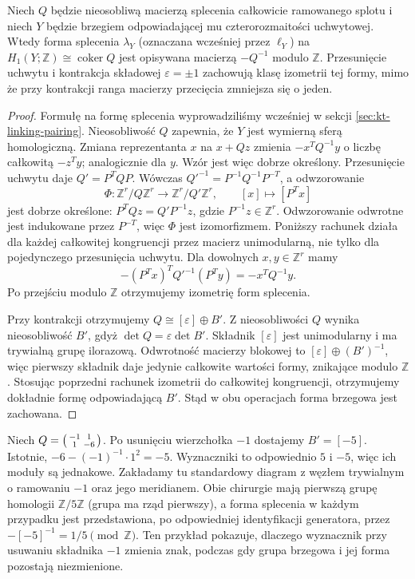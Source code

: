 \begin{stwierdzenie}
Niech $Q$ będzie nieosobliwą macierzą splecenia
całkowicie ramowanego splotu i niech $Y$ będzie
brzegiem odpowiadającej mu czterorozmaitości uchwytowej.
Wtedy forma splecenia $\lambda_Y$ (oznaczana wcześniej przez $\ell_Y$) na
$H_1(Y;\mathbb Z)\cong\operatorname{coker}Q$ jest
opisywana macierzą $-Q^{-1}$ modulo $\mathbb Z$.
Przesunięcie uchwytu i kontrakcja składowej
$\varepsilon=\pm1$ zachowują klasę izometrii
tej formy, mimo że przy kontrakcji ranga macierzy
przecięcia zmniejsza się o jeden.
\end{stwierdzenie}
\begin{proof}
Formułę na formę splecenia wyprowadziliśmy wcześniej
w sekcji \ref{sec:kt-linking-pairing}.
Nieosobliwość $Q$ zapewnia, że $Y$ jest wymierną
sferą homologiczną. Zmiana reprezentanta $x$
na $x+Qz$ zmienia $-x^TQ^{-1}y$
o liczbę całkowitą $-z^Ty$; analogicznie
dla $y$. Wzór jest więc dobrze określony. Przesunięcie
uchwytu daje $Q'=P^TQP$. Wówczas
${Q'}^{-1}=P^{-1}Q^{-1}P^{-T}$, a odwzorowanie
\[
 \Phi\colon \mathbb Z^r/Q\mathbb Z^r
 \longrightarrow \mathbb Z^r/Q'\mathbb Z^r,\qquad
 [x]\longmapsto[P^Tx]
\]
jest dobrze określone: $P^TQz=Q'P^{-1}z$,
gdzie $P^{-1}z\in\mathbb Z^r$.
Odwzorowanie odwrotne jest indukowane przez $P^{-T}$,
więc $\Phi$ jest izomorfizmem. Poniższy rachunek działa dla każdej całkowitej
kongruencji przez macierz unimodularną, nie tylko
dla pojedynczego przesunięcia uchwytu.
Dla dowolnych $x,y\in\mathbb Z^r$ mamy
\[
 -(P^Tx)^T{Q'}^{-1}(P^Ty)=-x^TQ^{-1}y.
\]
Po przejściu modulo $\mathbb Z$ otrzymujemy izometrię
form splecenia.

Przy kontrakcji otrzymujemy
$Q\cong[\varepsilon]\oplus B'$.
Z nieosobliwości $Q$ wynika nieosobliwość $B'$,
gdyż $\det Q=\varepsilon\det B'$.
Składnik $[\varepsilon]$ jest unimodularny i ma
trywialną grupę ilorazową. Odwrotność macierzy
blokowej to $[\varepsilon]\oplus(B')^{-1}$,
więc pierwszy składnik daje jedynie całkowite
wartości formy, znikające modulo $\mathbb Z$.
Stosując poprzedni rachunek izometrii do
całkowitej kongruencji, otrzymujemy dokładnie
formę odpowiadającą $B'$. Stąd w obu operacjach
forma brzegowa jest zachowana.
\end{proof}

\begin{przyklad}
Niech $Q=\begin{psmallmatrix}-1&1\\1&-6\end{psmallmatrix}$.
Po usunięciu wierzchołka $-1$ dostajemy $B'=[-5]$.
Istotnie, $-6-(-1)^{-1}\cdot1^2=-5$.
Wyznaczniki to odpowiednio $5$ i $-5$,
więc ich moduły są jednakowe. Zakładamy tu standardowy diagram z węzłem
trywialnym o ramowaniu $-1$ oraz jego meridianem.
Obie chirurgie mają pierwszą grupę homologii
$\mathbb Z/5\mathbb Z$ (grupa ma rząd pierwszy),
a forma splecenia w każdym przypadku jest
przedstawiona, po odpowiedniej identyfikacji
generatora, przez $-[-5]^{-1}=1/5\pmod{\mathbb Z}$.
Ten przykład pokazuje, dlaczego wyznacznik
przy usuwaniu składnika $-1$ zmienia znak, podczas
gdy grupa brzegowa i jej forma pozostają niezmienione.
\end{przyklad}

